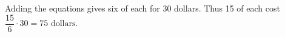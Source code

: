 Adding the equations gives six of each for 30 dollars. Thus 15 of each cost $\dfrac{15}{6}\cdot30=\boxed{75\text{ dollars}}$.
